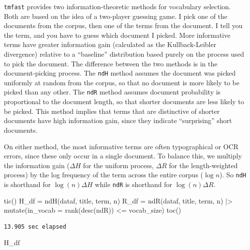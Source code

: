 \documentclass[
]{article}
\newenvironment{Shaded}{\begin{snugshade}}{\end{snugshade}}
\newcommand{\AttributeTok}[1]{\textcolor[rgb]{0.40,0.45,0.13}{#1}}
\newcommand{\FunctionTok}[1]{\textcolor[rgb]{0.28,0.35,0.67}{#1}}
\newcommand{\NormalTok}[1]{\textcolor[rgb]{0.00,0.23,0.31}{#1}}
\newcommand{\OtherTok}[1]{\textcolor[rgb]{0.00,0.23,0.31}{#1}}
\newcommand{\SpecialCharTok}[1]{\textcolor[rgb]{0.37,0.37,0.37}{#1}}
\begin{document}
\texttt{tmfast} provides two information-theoretic methods for
vocabulary selection. Both are based on the idea of a two-player
guessing game. I pick one of the documents from the corpus, then one of
the terms from the document. I tell you the term, and you have to guess
which document I picked. More informative terms have greater information
gain (calculated as the Kullback-Leibler divergence) relative to a
``baseline'' distribution based purely on the process used to pick the
document. The difference between the two methods is in the
document-picking process. The \texttt{ndH} method assumes the document
was picked uniformly at random from the corpus, so that no document is
more likely to be picked than any other. The \texttt{ndR} method assumes
document probability is proportional to the document length, so that
shorter documents are less likely to be picked. This method implies that
terms that are distinctive of shorter documents have high information
gain, since they indicate ``surprising'' short documents.

On either method, the most informative terms are often typographical or
OCR errors, since these only occur in a single document. To balance
this, we multiply the information gain (\(\Delta H\) for the uniform
process, \(\Delta R\) for the length-weighted process) by the log
frequency of the term across the entire corpus (\(\log n\)). So
\texttt{ndH} is shorthand for \(\log(n) \Delta H\) while \texttt{ndR} is
shorthand for \(\log(n) \Delta R\).

\begin{Shaded}
\begin{Highlighting}[]
\FunctionTok{tic}\NormalTok{()}
\NormalTok{H\_df }\OtherTok{=} \FunctionTok{ndH}\NormalTok{(dataf, title, term, n)}
\NormalTok{R\_df }\OtherTok{=} \FunctionTok{ndR}\NormalTok{(dataf, title, term, n) }\SpecialCharTok{|\textgreater{}}
    \FunctionTok{mutate}\NormalTok{(}\AttributeTok{in\_vocab =} \FunctionTok{rank}\NormalTok{(}\FunctionTok{desc}\NormalTok{(ndR)) }\SpecialCharTok{\textless{}=}\NormalTok{ vocab\_size)}
\FunctionTok{toc}\NormalTok{()}
\end{Highlighting}
\end{Shaded}

\begin{verbatim}
13.905 sec elapsed
\end{verbatim}

\begin{Shaded}
\begin{Highlighting}[]
\NormalTok{H\_df}
\end{Highlighting}
\end{Shaded}
\end{document}

